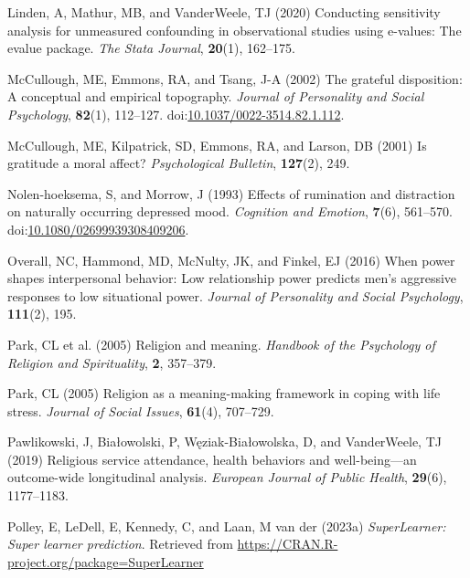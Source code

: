 \documentclass[
  single column]{article}
\newlength{\cslhangindent}
\newenvironment{CSLReferences}[2] %
 {\begin{list}{}{%
  \setlength{\itemindent}{0pt}
  \setlength{\leftmargin}{0pt}
  \setlength{\parsep}{0pt}
  \ifodd #1
   \setlength{\leftmargin}{\cslhangindent}
   \setlength{\itemindent}{-1\cslhangindent}
  \fi
  \setlength{\itemsep}{#2\baselineskip}}}
 {\end{list}}
\begin{document}
\begin{CSLReferences}{1}{0}
Linden, A, Mathur, MB, and VanderWeele, TJ (2020) Conducting sensitivity
analysis for unmeasured confounding in observational studies using
e-values: The evalue package. \emph{The Stata Journal}, \textbf{20}(1),
162--175.

McCullough, ME, Emmons, RA, and Tsang, J-A (2002) The grateful
disposition: A conceptual and empirical topography. \emph{Journal of
Personality and Social Psychology}, \textbf{82}(1), 112--127.
doi:\href{https://doi.org/10.1037/0022-3514.82.1.112}{10.1037/0022-3514.82.1.112}.

McCullough, ME, Kilpatrick, SD, Emmons, RA, and Larson, DB (2001) Is
gratitude a moral affect? \emph{Psychological Bulletin},
\textbf{127}(2), 249.

Nolen-hoeksema, S, and Morrow, J (1993) Effects of rumination and
distraction on naturally occurring depressed mood. \emph{Cognition and
Emotion}, \textbf{7}(6), 561--570.
doi:\href{https://doi.org/10.1080/02699939308409206}{10.1080/02699939308409206}.

Overall, NC, Hammond, MD, McNulty, JK, and Finkel, EJ (2016) When power
shapes interpersonal behavior: Low relationship power predicts men's
aggressive responses to low situational power. \emph{Journal of
Personality and Social Psychology}, \textbf{111}(2), 195.

Park, CL et al. (2005) Religion and meaning. \emph{Handbook of the
Psychology of Religion and Spirituality}, \textbf{2}, 357--379.

Park, CL (2005) Religion as a meaning-making framework in coping with
life stress. \emph{Journal of Social Issues}, \textbf{61}(4), 707--729.

Pawlikowski, J, Białowolski, P, Węziak-Białowolska, D, and VanderWeele,
TJ (2019) Religious service attendance, health behaviors and
well-being---an outcome-wide longitudinal analysis. \emph{European
Journal of Public Health}, \textbf{29}(6), 1177--1183.

Polley, E, LeDell, E, Kennedy, C, and Laan, M van der (2023a)
\emph{SuperLearner: Super learner prediction}. Retrieved from
\url{https://CRAN.R-project.org/package=SuperLearner}


\end{CSLReferences}
\end{document}
